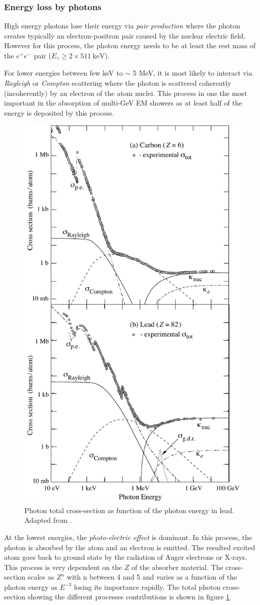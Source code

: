 \subsubsection{Energy loss by photons}

High energy photons lose their energy via \textit{pair production} where the photon creates typically an electron-positron pair caused by the nuclear electric field. However for this process, the photon energy needs to be at least the rest mass of the $e^+e^-$ pair ($E_{\gamma} \geq 2 \times \SI{511}{\kilo\eV}$).

For lower energies between few keV to $\sim$ 5 MeV, it is most likely to interact via \textit{Rayleigh} or \textit{Compton} scattering where the photon is scattered coherently (incoherently) by an electron of the atom nuclei. This process in one the most important in the absorption of multi-GeV EM showers as at least half of the energy is deposited by this process.
\begin{figure}[htbp!]
  \centering
  \includegraphics[width=0.5\linewidth]{chap2/fig/sigma_both_06.pdf}
  \caption{Photon total cross-section as function of the photon energy in lead. Adapted from \cite{Patrignani:2016xqp}.} \label{fig:GammaEMloss}
\end{figure}

At the lowest energies, the  \textit{photo-electric effect} is dominant. In this process, the photon is absorbed by the atom and an electron is emitted. The resulted excited atom goes back to ground state by the radiation of Auger electrons or X-rays. This process is very dependent on the $Z$ of the absorber material. The cross-section scales as $Z^n$ with n between 4 and 5 and varies as a function of the photon energy as $E^{-3}$ losing its importance rapidly. The total photon cross-section showing the different processes contributions is shown in figure \ref{fig:GammaEMloss}.

